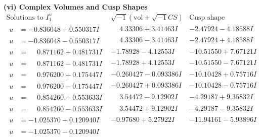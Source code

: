 \documentclass[1p]{elsarticle_modified}
\theoremstyle{definition}
\newcommand{\I}{\sqrt{-1}}
\begin{document}
\newpage\flushleft \textbf{(vi) Complex Volumes and Cusp Shapes}
$$\begin{array}{c|c|c}  
\text{Solutions to }I^u_{1}& \I (\text{vol} + \sqrt{-1}CS) & \text{Cusp shape}\\
 \hline 
\begin{aligned}
u &= -0.836048 + 0.550317 I\end{aligned}
 & \phantom{-}4.33306 + 3.41463 I & -2.47924 - 4.18588 I \\ \hline\begin{aligned}
u &= -0.836048 - 0.550317 I\end{aligned}
 & \phantom{-}4.33306 - 3.41463 I & -2.47924 + 4.18588 I \\ \hline\begin{aligned}
u &= \phantom{-}0.871162 + 0.481731 I\end{aligned}
 & -1.78928 - 4.12553 I & -10.51550 + 7.67121 I \\ \hline\begin{aligned}
u &= \phantom{-}0.871162 - 0.481731 I\end{aligned}
 & -1.78928 + 4.12553 I & -10.51550 - 7.67121 I \\ \hline\begin{aligned}
u &= \phantom{-}0.976200 + 0.175447 I\end{aligned}
 & -0.260427 - 0.093386 I & -10.10428 + 0.75716 I \\ \hline\begin{aligned}
u &= \phantom{-}0.976200 - 0.175447 I\end{aligned}
 & -0.260427 + 0.093386 I & -10.10428 - 0.75716 I \\ \hline\begin{aligned}
u &= \phantom{-}0.854260 + 0.553633 I\end{aligned}
 & \phantom{-}3.54472 - 9.12902 I & -4.29187 + 9.35832 I \\ \hline\begin{aligned}
u &= \phantom{-}0.854260 - 0.553633 I\end{aligned}
 & \phantom{-}3.54472 + 9.12902 I & -4.29187 - 9.35832 I \\ \hline\begin{aligned}
u &= -1.025370 + 0.120940 I\end{aligned}
 & -0.97680 + 5.27922 I & -11.94161 - 5.93896 I \\ \hline\begin{aligned}
u &= -1.025370 - 0.120940 I\end{aligned}

\end{array}$$
\end{document}
